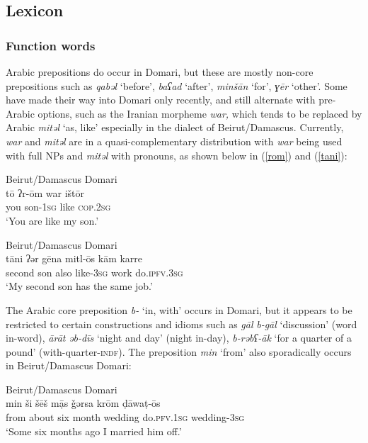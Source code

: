 \documentclass[output=paper]{langsci/langscibook}
\begin{document}
 \subsection{Lexicon}
 \subsubsection{Function words}

Arabic prepositions do occur in Domari, but these are mostly non-core prepositions such as \textit{qabəl} ‘before’, \textit{baʕad} ‘after’, \textit{minšān} ‘for’, \textit{ɣēr} ‘other’. Some have made their way into Domari only recently, and still alternate with pre-Arabic options, such as the Iranian morpheme \textit{war,} which tends to be replaced by Arabic \textit{mitəl} ‘as, like’ especially in the dialect of Beirut/Damascus. Currently, \textit{war} and \textit{mitəl} are in a quasi-complementary distribution with \textit{war} being used with full NPs and \textit{mitəl} with pronouns, as shown below in (\ref{rom}) and (\ref{tani}):

\ea
{Beirut/Damascus Domari}\\ \label{rom}
\gll tō ʔr-ōm war ištōr\\
     you son-\textsc{1sg} like \textsc{cop.2sg}\\
\glt ‘You are like my son.’
\z

\ea\label{ex:key:} \label{tani}
{Beirut/Damascus Domari}\\
\gll tāni ʔər gēna mitl-ōs kām karre\\
     second son also like-\textsc{3sg} work do.\textsc{ipfv.3sg}\\
\glt ‘My second son has the same job.’
\z

The Arabic core preposition \textit{b-} ‘in, with’ occurs in Domari, but it appears to be restricted to certain constructions and idioms such as \textit{gāl} \textit{b-gāl} ‘discussion’ (word in-word), \textit{ārāt} \textit{əb-dīs} ‘night and day’ (night in-day), \textit{b-rəbʕ-āk} ‘for a quarter of a pound’ (with-quarter-\textsc{indf}). The preposition \textit{min} ‘from’ also sporadically occurs in Beirut/Damascus Domari:

\ea\label{ex:key:}
{Beirut/Damascus Domari}\\
\gll min ši šēš mạ̄s ǧərsa krōm ḍāwaṭ-ōs\\
     from about six month wedding do.\textsc{pfv.1sg} wedding-\textsc{3sg}\\
\glt ‘Some six months ago I married him off.’
\z
 
\end{document}
